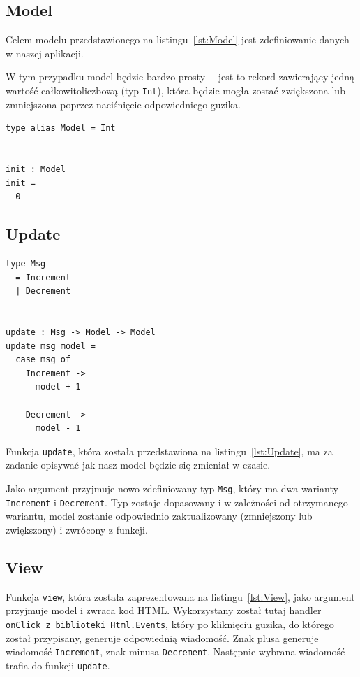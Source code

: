\documentclass[twoside,a4paper]{report}
\begin{document}
\subsection{Model}
\begin{minipage}{.50\textwidth}
    Celem modelu przedstawionego na listingu~\ref{lst:Model} jest zdefiniowanie danych w naszej aplikacji.

    W tym przypadku model będzie bardzo prosty~-- jest to rekord zawierający jedną wartość całkowitoliczbową (typ \texttt{Int}), która będzie mogła zostać zwiększona lub zmniejszona poprzez naciśnięcie odpowiedniego guzika.
\end{minipage}\hfill
\begin{minipage}{.43\textwidth}
    \lstset{frame=single}
    \begin{lstlisting}[caption={\textit{The Elm Architecture} -- Model},label={lst:Model}]
type alias Model = Int


init : Model
init =
  0
    \end{lstlisting}
\end{minipage}\hfill

\subsection{Update}
\begin{minipage}{.43\textwidth}
    \lstset{frame=single}
    \begin{lstlisting}[caption={\textit{The Elm Architecture} -- Update},label={lst:Update}]
type Msg
  = Increment
  | Decrement


update : Msg -> Model -> Model
update msg model =
  case msg of
    Increment ->
      model + 1

    Decrement ->
      model - 1
    \end{lstlisting}
\end{minipage}\hfill
\begin{minipage}{.50\textwidth}
    Funkcja \texttt{update}, która została przedstawiona na listingu~\ref{lst:Update}, ma za zadanie opisywać jak nasz model będzie się zmieniał w czasie.

    Jako argument przyjmuje nowo zdefiniowany typ \texttt{Msg}, który ma dwa warianty~-- \texttt{Increment} i \texttt{Decrement}. Typ zostaje dopasowany i w zależności od otrzymanego wariantu, model zostanie odpowiednio zaktualizowany (zmniejszony lub zwiększony) i zwrócony z funkcji.
\end{minipage}\hfill
\subsection{View}
Funkcja \texttt{view}, która została zaprezentowana na listingu~\ref{lst:View}, jako argument przyjmuje model i zwraca kod HTML\@.
Wykorzystany został tutaj handler \texttt{onClick z biblioteki \texttt{Html.Events}}, który po kliknięciu guzika, do którego został przypisany, generuje odpowiednią wiadomość.
Znak plusa generuje wiadomość \texttt{Increment}, znak minusa \texttt{Decrement}.
Następnie wybrana wiadomość trafia do funkcji \texttt{update}.
\end{document}
